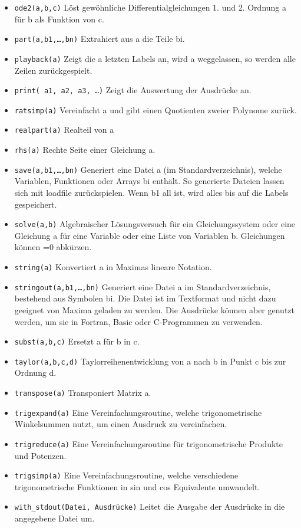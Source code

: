 \documentclass[12pt]{scrartcl}
\begin{document}
\begin{itemize}
\item \texttt{ode2(a,b,c)} Löst gewöhnliche Differentialgleichungen 1.
  und  2. Ordnung a für b als Funktion von c.
\item \texttt{part(a,b1,\ldots,bn)} Extrahiert aus a die Teile bi.
\item \texttt{playback(a)} Zeigt die a letzten Labels an, wird a
  weggelassen, so  werden alle Zeilen zurückgespielt.
\item \texttt{print( a1, a2, a3, \ldots )} Zeigt die Auswertung der
  Ausdrücke  an.
\item \texttt{ratsimp(a)} Vereinfacht a und gibt einen Quotienten zweier
  Polynome  zurück.
\item \texttt{realpart(a)} Realteil von a
\item \texttt{rhs(a)} Rechte Seite einer Gleichung a.
\item \texttt{save(a,b1,\ldots,bn)} Generiert eine Datei a (im
  Standardverzeichnis), welche Variablen, Funktionen oder Arrays bi
  enthält. So generierte Dateien  lassen sich mit loadfile
  zurückspielen. Wenn b1  all ist, wird alles bis auf die Labels gespeichert.
\item \texttt{solve(a,b)} Algebraischer Lösungsversuch für ein
  Gleichungssystem  oder eine Gleichung a für eine Variable oder eine
  Liste von  Variablen b. Gleichungen können =0 abkürzen.
\item \texttt{string(a)} Konvertiert a in Maximas lineare Notation.
\item \texttt{stringout(a,b1,\ldots,bn)} Generiert eine Datei a im
  Standardverzeichnis, bestehend aus Symbolen bi. Die Datei ist im
  Textformat und nicht dazu geeignet von Maxima geladen zu werden. Die
  Ausdrücke können aber genutzt werden,  um sie in Fortran, Basic oder
  C-Programmen  zu verwenden.
\item \texttt{subst(a,b,c)} Ersetzt a für b in c.
\item \texttt{taylor(a,b,c,d)} Taylorreihenentwicklung von a nach b in
  Punkt c  bis zur Ordnung d.
\item \texttt{transpose(a)} Transponiert Matrix a.
\item \texttt{trigexpand(a)} Eine Vereinfachungsroutine, welche
  trigonometrische  Winkelsummen nutzt, um einen Ausdruck zu vereinfachen.
\item \texttt{trigreduce(a)} Eine Vereinfachungsroutine für
  trigonometrische  Produkte und Potenzen.
\item \texttt{trigsimp(a)} Eine Vereinfachungsroutine, welche
  verschiedene  trigonometrische Funktionen in sin und cos Equivalente umwandelt.
\item \texttt{with\_stdout(Datei, Ausdrücke)} Leitet die Ausgabe der
  Ausdrücke  in die angegebene Datei um.
\end{itemize}
\end{document}
